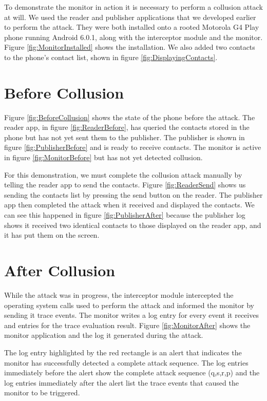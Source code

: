 To demonstrate the monitor in action it is necessary to perform a collusion attack at will.  We used the reader and publisher applications that we developed earlier to perform the attack.  They were both installed onto a rooted Motorola G4 Play phone running Android 6.0.1, along with the interceptor module and the monitor.  Figure \ref{fig:MonitorInstalled} shows the installation.  We also added two contacts to the phone's contact list, shown in figure \ref{fig:DisplayingContacts}.

\section{Before Collusion}

Figure \ref{fig:BeforeCollusion} shows the state of the phone before the attack.  The reader app, in figure \ref{fig:ReaderBefore}, has queried the contacts stored in the phone but has not yet sent them to the publisher.  The publisher is shown in figure \ref{fig:PublisherBefore} and is ready to receive contacts.  The monitor is active in figure \ref{fig:MonitorBefore} but has not yet detected collusion.

For this demonstration, we must complete the collusion attack manually by telling the reader app to send the contacts.  Figure \ref{fig:ReaderSend} shows us sending the contacts list by pressing the send button on the reader.  The publisher app then completed the attack when it received and displayed the contacts.  We can see this happened in figure \ref{fig:PublisherAfter} because the publisher log shows it received two identical contacts to those displayed on the reader app, and it has put them on the screen.

\section{After Collusion}

While the attack was in progress, the interceptor module intercepted the operating system calls used to perform the attack and informed the monitor by sending it trace events.  The monitor writes a log entry for every event it receives and entries for the trace evaluation result.  Figure \ref{fig:MonitorAfter} shows the monitor application and the log it generated during the attack.

The log entry highlighted by the red rectangle is an alert that indicates the monitor has successfully detected a complete attack sequence.  The log entries immediately before the alert show the complete attack sequence (q,s,r,p) and the log entries immediately after the alert list the trace events that caused the monitor to be triggered.

